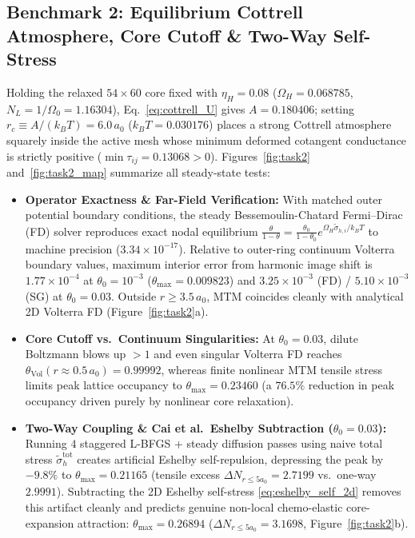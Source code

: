 \documentclass[11pt,a4paper]{article}
\begin{document}
\subsection{Benchmark 2: Equilibrium Cottrell Atmosphere, Core Cutoff \& Two-Way Self-Stress}
\label{subsec:bench_task2}

Holding the relaxed $54 \times 60$ core fixed with $\eta_H = 0.08$ ($\Omega_H = 0.068785$, $N_L = 1/\Omega_0 = 1.16304$), Eq.~\eqref{eq:cottrell_U} gives $A = 0.180406$; setting $r_c \equiv A/(k_B T) = 6.0\,a_0$ ($k_B T = 0.030176$) places a strong Cottrell atmosphere squarely inside the active mesh whose minimum deformed cotangent conductance is strictly positive ($\min \tau_{ij} = 0.13068 > 0$). Figures~\ref{fig:task2} and~\ref{fig:task2_map} summarize all steady-state tests:
\begin{itemize}[nosep]
  \item \textbf{Operator Exactness \& Far-Field Verification:} With matched outer potential boundary conditions, the steady Bessemoulin-Chatard Fermi--Dirac (FD) solver reproduces exact nodal equilibrium $\frac{\theta}{1-\theta} = \frac{\theta_0}{1-\theta_0}e^{\Omega_H\tilde{\sigma}_{h,i}/k_B T}$ to machine precision ($3.34 \times 10^{-17}$). Relative to outer-ring continuum Volterra boundary values, maximum interior error from harmonic image shift is $1.77 \times 10^{-4}$ at $\theta_0 = 10^{-3}$ ($\theta_{\max} = 0.009823$) and $3.25 \times 10^{-3}$ (FD) / $5.10 \times 10^{-3}$ (SG) at $\theta_0 = 0.03$. Outside $r \ge 3.5\,a_0$, MTM coincides cleanly with analytical 2D Volterra FD (Figure~\ref{fig:task2}a).
  \item \textbf{Core Cutoff vs.\ Continuum Singularities:} At $\theta_0 = 0.03$, dilute Boltzmann blows up $> 1$ and even singular Volterra FD reaches $\theta_{\text{Vol}}(r\approx 0.5\,a_0) = 0.99992$, whereas finite nonlinear MTM tensile stress limits peak lattice occupancy to \textbf{$\theta_{\max} = 0.23460$} (a $76.5\%$ reduction in peak occupancy driven purely by nonlinear core relaxation).
  \item \textbf{Two-Way Coupling \& Cai et al.\ Eshelby Subtraction ($\theta_0 = 0.03$):} Running $4$ staggered L-BFGS + steady diffusion passes using naive total stress $\tilde{\sigma}_{h}^{\text{tot}}$ creates artificial Eshelby self-repulsion, depressing the peak by \textbf{$-9.8\%$} to $\theta_{\max} = 0.21165$ (tensile excess $\Delta N_{r\le 5a_0} = 2.7199$ vs.\ one-way $2.9991$). Subtracting the 2D Eshelby self-stress \eqref{eq:eshelby_self_2d} removes this artifact cleanly and predicts genuine non-local chemo-elastic core-expansion attraction: \textbf{$\theta_{\max} = 0.26894$} ($\Delta N_{r\le 5a_0} = 3.1698$, Figure~\ref{fig:task2}b).

\end{itemize}
\end{document}
